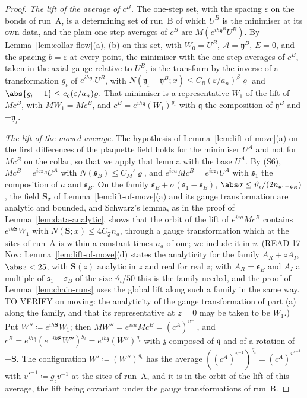 \begin{proof}
\emph{The lift of the average of $c^B$.} The one-step set, with the spacing $\varepsilon$ on the bonds of run~A, is a determining set of run~B of which $U^B$ is the minimiser at its own data, and the plain one-step averages of $c^B$ are $M(e^{ih\mathfrak y^B}U^B)$. By Lemma~\ref{lem:collar-flow}(a), (b) on this set, with $W_0 = U^B$, $\mathcal A = \mathfrak y^B$, $E = 0$, and the spacing $b = \varepsilon$ at every point, the minimiser with the one-step averages of $c^B$, taken in the axial gauge relative to $U^B$, is the transform by the inverse of a transformation $g_\iota$ of $e^{ih\mathfrak y_\iota}U^B$, with $N(\mathfrak y_\iota - \mathfrak y^B; x) \leq C_{\mathrm{fl}}(\varepsilon/a_n)^\beta\varrho$ and $\abs{g_\iota - 1} \leq c_g(\varepsilon/a_n)\varrho$. That minimiser is a representative $W_1$ of the lift of $Mc^B$, with $MW_1 = Mc^B$, and $c^B = e^{ih\mathfrak q}(W_1)^{g_\iota}$ with $\mathfrak q$ the composition of $\mathfrak y^B$ and $-\mathfrak y_\iota$.

\emph{The lift of the moved average.} The hypothesis of Lemma~\ref{lem:lift-of-move}(a) on the first differences of the plaquette field holds for the minimiser $U^A$ and not for $Mc^B$ on the collar, so that we apply that lemma with the base $U^A$. By (S6), $Mc^B = e^{i\varepsilon\mathfrak s_B}U^A$ with $N(\mathfrak s_B) \leq C_M'\varrho$, and $e^{i\varepsilon a}Mc^B = e^{i\varepsilon\mathfrak s_1}U^A$ with $\mathfrak s_1$ the composition of $a$ and $\mathfrak s_B$. On the family $\mathfrak s_B + \sigma(\mathfrak s_1 - \mathfrak s_B)$, $\abs\sigma \leq \vartheta_\iota/(2n_{\mathfrak s_1 - \mathfrak s_B})$, the field $\mathbf S_\sigma$ of Lemma~\ref{lem:lift-of-move}(a) and its gauge transformation are analytic and bounded, and Schwarz's lemma, as in the proof of Lemma~\ref{lem:data-analytic}, shows that the orbit of the lift of $e^{i\varepsilon a}Mc^B$ contains $e^{ih\mathbf S}W_1$ with $N(\mathbf S; x) \leq 4C_{\mathfrak F}n_a$, through a gauge transformation which at the sites of run~A is within a constant times $n_a$ of one; we include it in $v$. (READ 17 Nov: Lemma~\ref{lem:lift-of-move}(d) states the analyticity for the family $A_R + zA_I$, $\abs z < 25$, with $\mathbf S(z)$ analytic in $z$ and real for real $z$; with $A_R = \mathfrak s_B$ and $A_I$ a multiple of $\mathfrak s_1 - \mathfrak s_B$ of the size $\vartheta_\iota/50$ this is the family needed, and the proof of Lemma~\ref{lem:chain-runs} uses the global lift along such a family in the same way. TO VERIFY on moving: the analyticity of the gauge transformation of part (a) along the family, and that its representative at $z = 0$ may be taken to be $W_1$.) Put $W'' \coloneqq e^{ih\mathbf S}W_1$; then $MW'' = e^{i\varepsilon a}Mc^B = (c^A)^{v^{-1}}$, and $c^B = e^{ih\mathfrak q}(e^{-ih\mathbf S}W'')^{g_\iota} = e^{ih\mathfrak z}(W'')^{g_\iota}$ with $\mathfrak z$ composed of $\mathfrak q$ and of a rotation of $-\mathbf S$. The configuration $W' \coloneqq (W'')^{g_\iota}$ has the average $((c^A)^{v^{-1}})^{g_\iota} = (c^A)^{v'^{-1}}$ with $v'^{-1} \coloneqq g_\iota v^{-1}$ at the sites of run~A, and it is in the orbit of the lift of this average, the lift being covariant under the gauge transformations of run~B.
\end{proof}

